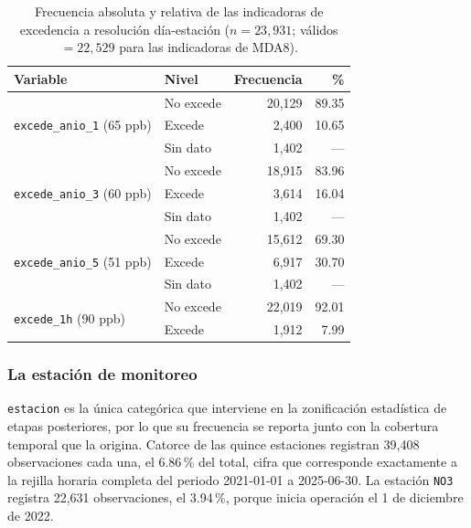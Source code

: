 \begin{table}[t]
  \centering
  \caption{Frecuencia absoluta y relativa de las indicadoras de excedencia a
    resolución día-estación ($n = 23{,}931$; válidos $= 22{,}529$ para las
    indicadoras de MDA8).}
  \label{tab:freq-diaria}
  \small
  \begin{tabular}{llrr}
    \toprule
    Variable & Nivel & Frecuencia & \% \\
    \midrule
    \multirow{3}{*}{\texttt{excede\_anio\_1} (65 ppb)}
                                        & No excede &  20,129 &  89.35 \\
                                        & Excede    &   2,400 &  10.65 \\
                                        & Sin dato  &   1,402 &    --- \\
    \midrule
    \multirow{3}{*}{\texttt{excede\_anio\_3} (60 ppb)}
                                        & No excede &  18,915 &  83.96 \\
                                        & Excede    &   3,614 &  16.04 \\
                                        & Sin dato  &   1,402 &    --- \\
    \midrule
    \multirow{3}{*}{\texttt{excede\_anio\_5} (51 ppb)}
                                        & No excede &  15,612 &  69.30 \\
                                        & Excede    &   6,917 &  30.70 \\
                                        & Sin dato  &   1,402 &    --- \\
    \midrule
    \multirow{2}{*}{\texttt{excede\_1h} (90 ppb)}
                                        & No excede &  22,019 &  92.01 \\
                                        & Excede    &   1,912 &   7.99 \\
    \bottomrule
  \end{tabular}
\end{table}

\subsubsection{La estación de monitoreo}

\texttt{estacion} es la única categórica que interviene en la zonificación
estadística de etapas posteriores, por lo que su frecuencia se reporta junto
con la cobertura temporal que la origina. Catorce de las quince estaciones
registran 39,408 observaciones cada una, el 6.86\,\% del total, cifra que
corresponde exactamente a la rejilla horaria completa del periodo
2021-01-01 a 2025-06-30. La estación \texttt{NO3} registra 22,631
observaciones, el 3.94\,\%, porque inicia operación el 1 de diciembre de 2022.

